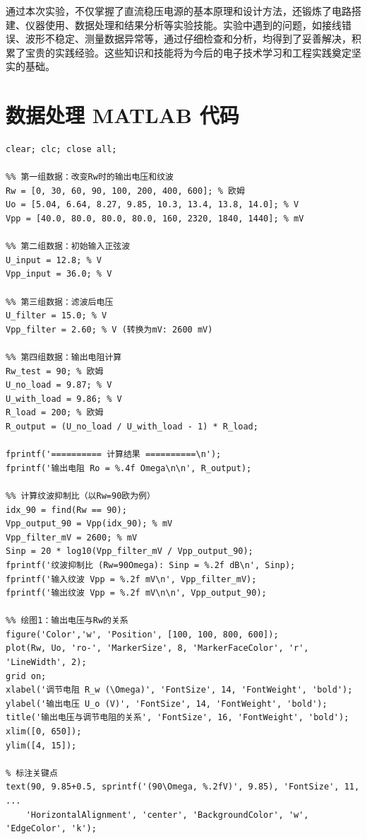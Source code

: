 ﻿\documentclass[12pt,a4paper]{article}
\begin{document}
通过本次实验，不仅掌握了直流稳压电源的基本原理和设计方法，还锻炼了电路搭建、仪器使用、数据处理和结果分析等实验技能。实验中遇到的问题，如接线错误、波形不稳定、测量数据异常等，通过仔细检查和分析，均得到了妥善解决，积累了宝贵的实践经验。这些知识和技能将为今后的电子技术学习和工程实践奠定坚实的基础。

\clearpage
\appendix

\section{数据处理 MATLAB 代码}

\begin{lstlisting}[style=Matlab-boxed,caption={直流稳压电源数据处理代码}]
clear; clc; close all;

%% 第一组数据：改变Rw时的输出电压和纹波
Rw = [0, 30, 60, 90, 100, 200, 400, 600]; % 欧姆
Uo = [5.04, 6.64, 8.27, 9.85, 10.3, 13.4, 13.8, 14.0]; % V
Vpp = [40.0, 80.0, 80.0, 80.0, 160, 2320, 1840, 1440]; % mV

%% 第二组数据：初始输入正弦波
U_input = 12.8; % V
Vpp_input = 36.0; % V

%% 第三组数据：滤波后电压
U_filter = 15.0; % V
Vpp_filter = 2.60; % V (转换为mV: 2600 mV)

%% 第四组数据：输出电阻计算
Rw_test = 90; % 欧姆
U_no_load = 9.87; % V
U_with_load = 9.86; % V
R_load = 200; % 欧姆
R_output = (U_no_load / U_with_load - 1) * R_load;

fprintf('========== 计算结果 ==========\n');
fprintf('输出电阻 Ro = %.4f Omega\n\n', R_output);

%% 计算纹波抑制比（以Rw=90欧为例）
idx_90 = find(Rw == 90);
Vpp_output_90 = Vpp(idx_90); % mV
Vpp_filter_mV = 2600; % mV
Sinp = 20 * log10(Vpp_filter_mV / Vpp_output_90);
fprintf('纹波抑制比 (Rw=90Omega): Sinp = %.2f dB\n', Sinp);
fprintf('输入纹波 Vpp = %.2f mV\n', Vpp_filter_mV);
fprintf('输出纹波 Vpp = %.2f mV\n\n', Vpp_output_90);

%% 绘图1：输出电压与Rw的关系
figure('Color','w', 'Position', [100, 100, 800, 600]);
plot(Rw, Uo, 'ro-', 'MarkerSize', 8, 'MarkerFaceColor', 'r', 'LineWidth', 2);
grid on;
xlabel('调节电阻 R_w (\Omega)', 'FontSize', 14, 'FontWeight', 'bold');
ylabel('输出电压 U_o (V)', 'FontSize', 14, 'FontWeight', 'bold');
title('输出电压与调节电阻的关系', 'FontSize', 16, 'FontWeight', 'bold');
xlim([0, 650]);
ylim([4, 15]);

% 标注关键点
text(90, 9.85+0.5, sprintf('(90\Omega, %.2fV)', 9.85), 'FontSize', 11, ...
    'HorizontalAlignment', 'center', 'BackgroundColor', 'w', 'EdgeColor', 'k');


\end{lstlisting}
\end{document}

